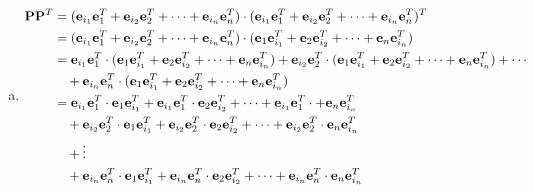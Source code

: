 \documentclass[11pt]{article}
\renewcommand{\vec}[1]{{\bf #1}}
\begin{document}
{\begin{enumerate}[a)]
\begin{align*}
\begin{bmatrix}
            0 & 0 & 0 & 1 \\
            0 & 0 & 0 & 0 \\
            0 & 0 & 0 & 0 \\
            0 & 0 & 0 & 0 \\
            \end{bmatrix} \\
        &= \begin{bmatrix}
            0 & 0 & 0 & 1 \\
            0 & 1 & 0 & 0 \\
            1 & 0 & 0 & 0 \\
            0 & 0 & 1 & 0 \\
            \end{bmatrix}
    \end{align*}
    \item \begin{align*}
        \vec{P}\vec{P}^{T} &= (\vec{e}_{i_1}\vec{e}_{1}^T + \vec{e}_{i_2}\vec{e}_{2}^T + \cdots + \vec{e}_{i_n}\vec{e}_{n}^T) \cdot (\vec{e}_{i_1}\vec{e}_{1}^T + \vec{e}_{i_2}\vec{e}_{2}^T + \cdots + \vec{e}_{i_n}\vec{e}_{n}^T)^{T} \\
        &= (\vec{e}_{i_1}\vec{e}_{1}^T + \vec{e}_{i_2}\vec{e}_{2}^T + \cdots + \vec{e}_{i_n}\vec{e}_{n}^T) \cdot (\vec{e}_{1}\vec{e}_{i_1}^T + \vec{e}_{2}\vec{e}_{i_2}^T + \cdots + \vec{e}_{n}\vec{e}_{i_n}^T) \\
        &= \vec{e}_{i_1}\vec{e}_{1}^T \cdot (\vec{e}_{1}\vec{e}_{i_1}^T + \vec{e}_{2}\vec{e}_{i_2}^T + \cdots + \vec{e}_{n}\vec{e}_{i_n}^T) + \vec{e}_{i_2}\vec{e}_{2}^T \cdot (\vec{e}_{1}\vec{e}_{i_1}^T + \vec{e}_{2}\vec{e}_{i_2}^T + \cdots + \vec{e}_{n}\vec{e}_{i_n}^T) + \cdots \\
        &\quad + \vec{e}_{i_n}\vec{e}_{n}^T \cdot (\vec{e}_{1}\vec{e}_{i_1}^T + \vec{e}_{2}\vec{e}_{i_2}^T + \cdots + \vec{e}_{n}\vec{e}_{i_n}^T) \\    
        &= \vec{e}_{i_1}\vec{e}_{1}^T \cdot \vec{e}_{1}\vec{e}_{i_1}^T + \vec{e}_{i_1}\vec{e}_{1}^T \cdot \vec{e}_{2}\vec{e}_{i_2}^T + \cdots + \vec{e}_{i_1}\vec{e}_{1}^T \cdot + \vec{e}_{n}\vec{e}_{i_n}^T \\
        &\quad + \vec{e}_{i_2}\vec{e}_{2}^T \cdot \vec{e}_{1}\vec{e}_{i_1}^T + \vec{e}_{i_2}\vec{e}_{2}^T \cdot \vec{e}_{2}\vec{e}_{i_2}^T + \cdots + \vec{e}_{i_2}\vec{e}_{2}^T \cdot \vec{e}_{n}\vec{e}_{i_n}^T \\
        &\quad + \vdots \\
        &\quad + \vec{e}_{i_n}\vec{e}_{n}^T \cdot \vec{e}_{1}\vec{e}_{i_1}^T + \vec{e}_{i_n}\vec{e}_{n}^T \cdot \vec{e}_{2}\vec{e}_{i_2}^T + \cdots + \vec{e}_{i_n}\vec{e}_{n}^T \cdot \vec{e}_{n}\vec{e}_{i_n}^T \\

\end{align*}
\end{enumerate}}
\end{document}
